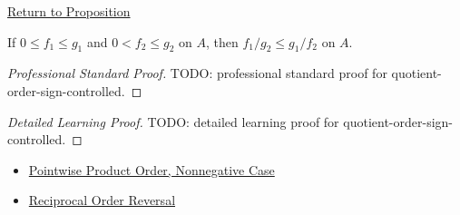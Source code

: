 \newpage
{}
\label{prf:quotient-order-sign-controlled}

\begin{remark*}[Return]
\hyperref[prop:quotient-order-sign-controlled]{Return to Proposition}
\end{remark*}

\begin{proposition*}
If \(0\leq f_1\leq g_1\) and \(0<f_2\leq g_2\) on \(A\), then
\(f_1/g_2\leq g_1/f_2\) on \(A\).
\end{proposition*}

\begin{proof}[Professional Standard Proof]
\LRAProofBodyStart
TODO: professional standard proof for quotient-order-sign-controlled.
\end{proof}

\begin{proof}[Detailed Learning Proof]
\LRAProofBodyStart
TODO: detailed learning proof for quotient-order-sign-controlled.
\end{proof}

\begin{remark*}
\end{remark*}

\begin{dependencies}
\begin{itemize}
  \item \hyperref[prop:pointwise-product-order-nonnegative]{Pointwise Product Order, Nonnegative Case}
  \item \hyperref[prop:reciprocal-order-reversal]{Reciprocal Order Reversal}
\end{itemize}
\end{dependencies}

\clearpage
